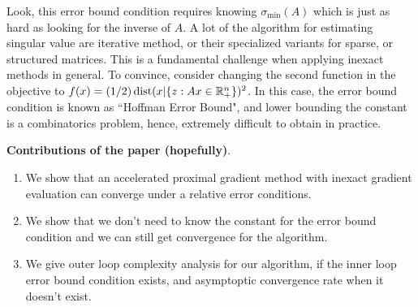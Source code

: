 \documentclass[12pt]{article}
\DeclareMathOperator{\dist}{\mathop{dist}}
\begin{document}
    Look, this error bound condition requires knowing $\sigma_{\min}(A)$ which is just as hard as looking for the inverse of $A$. 
    A lot of the algorithm for estimating singular value are iterative method, or their specialized variants for sparse, or structured matrices. 
    This is a fundamental challenge when applying inexact methods in general. 
    To convince, consider changing the second function in the objective to $f(x) = (1/2)\dist(x | \{z: Ax \in \RR^n_+\})^2$. 
    In this case, the error bound condition is known as ``Hoffman Error Bound", and lower bounding the constant is a combinatorics problem, hence, extremely difficult to obtain in practice. 
    \par
    \textbf{Contributions of the paper (hopefully)}.
    \begin{enumerate}[nosep]
        \item We show that an accelerated proximal gradient method with inexact gradient evaluation can converge under a relative error conditions. 
        \item We show that we don't need to know the constant for the error bound condition and we can still get convergence for the algorithm. 
        \item We give outer loop complexity analysis for our algorithm, if the inner loop error bound condition exists, and asymptoptic convergence rate when it doesn't exist. 
    \end{enumerate}
\end{document}

